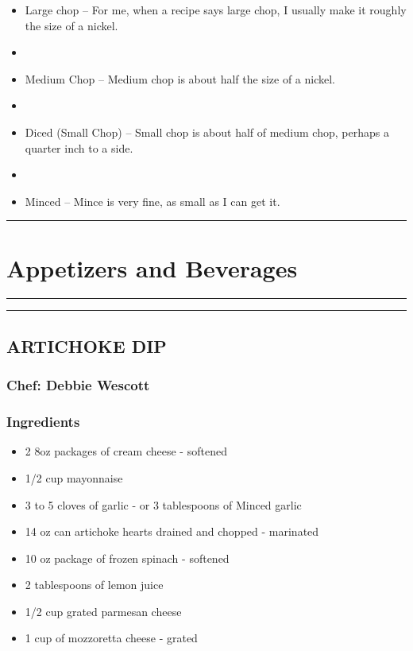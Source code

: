 \documentclass[
]{book}
\providecommand{\tightlist}{%
  \setlength{\itemsep}{0pt}\setlength{\parskip}{0pt}}
\begin{document}
\begin{itemize}
\item
  Large chop -- For me, when a recipe says large chop, I usually make it roughly the size of a nickel.
\item
\item
  Medium Chop -- Medium chop is about half the size of a nickel.
\item
\item
  Diced (Small Chop) -- Small chop is about half of medium chop, perhaps a quarter inch to a side.
\item
\item
  Minced -- Mince is very fine, as small as I can get it.
\end{itemize}

\begin{center}\rule{0.5\linewidth}{0.5pt}\end{center}

\hypertarget{appetizers}{%
\chapter{Appetizers and Beverages}\label{appetizers}}

\begin{center}\rule{0.5\linewidth}{0.5pt}\end{center}

\begin{center}\rule{0.5\linewidth}{0.5pt}\end{center}

\hypertarget{artichoke-dip}{%
\section*{ARTICHOKE DIP}\label{artichoke-dip}}


\hypertarget{chef-debbie-wescott}{%
\subsection*{Chef: Debbie Wescott}\label{chef-debbie-wescott}}


\hypertarget{ingredients}{%
\subsection*{Ingredients}\label{ingredients}}


\begin{itemize}
\tightlist
\item
  2 8oz packages of cream cheese - softened
\item
  1/2 cup mayonnaise
\item
  3 to 5 cloves of garlic - or 3 tablespoons of Minced garlic
\item
  14 oz can artichoke hearts drained and chopped - marinated
\item
  10 oz package of frozen spinach - softened
\item
  2 tablespoons of lemon juice
\item
  1/2 cup grated parmesan cheese
\item
  1 cup of mozzoretta cheese - grated
\end{itemize}
\end{document}
